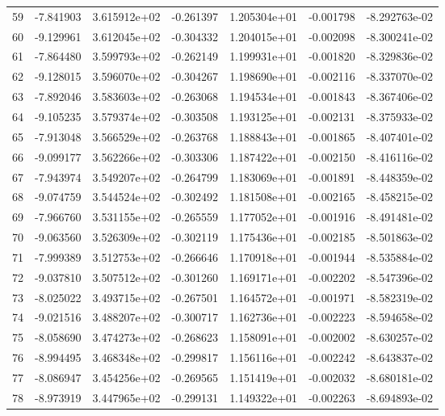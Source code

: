 \begin{tabular}{rrrrrrr}
  59 &  -7.841903 &  3.615912e+02 & -0.261397 &  1.205304e+01 &  -0.001798 & -8.292763e-02 \\
  60 &  -9.129961 &  3.612045e+02 & -0.304332 &  1.204015e+01 &  -0.002098 & -8.300241e-02 \\
  61 &  -7.864480 &  3.599793e+02 & -0.262149 &  1.199931e+01 &  -0.001820 & -8.329836e-02 \\
  62 &  -9.128015 &  3.596070e+02 & -0.304267 &  1.198690e+01 &  -0.002116 & -8.337070e-02 \\
  63 &  -7.892046 &  3.583603e+02 & -0.263068 &  1.194534e+01 &  -0.001843 & -8.367406e-02 \\
  64 &  -9.105235 &  3.579374e+02 & -0.303508 &  1.193125e+01 &  -0.002131 & -8.375933e-02 \\
  65 &  -7.913048 &  3.566529e+02 & -0.263768 &  1.188843e+01 &  -0.001865 & -8.407401e-02 \\
  66 &  -9.099177 &  3.562266e+02 & -0.303306 &  1.187422e+01 &  -0.002150 & -8.416116e-02 \\
  67 &  -7.943974 &  3.549207e+02 & -0.264799 &  1.183069e+01 &  -0.001891 & -8.448359e-02 \\
  68 &  -9.074759 &  3.544524e+02 & -0.302492 &  1.181508e+01 &  -0.002165 & -8.458215e-02 \\
  69 &  -7.966760 &  3.531155e+02 & -0.265559 &  1.177052e+01 &  -0.001916 & -8.491481e-02 \\
  70 &  -9.063560 &  3.526309e+02 & -0.302119 &  1.175436e+01 &  -0.002185 & -8.501863e-02 \\
  71 &  -7.999389 &  3.512753e+02 & -0.266646 &  1.170918e+01 &  -0.001944 & -8.535884e-02 \\
  72 &  -9.037810 &  3.507512e+02 & -0.301260 &  1.169171e+01 &  -0.002202 & -8.547396e-02 \\
  73 &  -8.025022 &  3.493715e+02 & -0.267501 &  1.164572e+01 &  -0.001971 & -8.582319e-02 \\
  74 &  -9.021516 &  3.488207e+02 & -0.300717 &  1.162736e+01 &  -0.002223 & -8.594658e-02 \\
  75 &  -8.058690 &  3.474273e+02 & -0.268623 &  1.158091e+01 &  -0.002002 & -8.630257e-02 \\
  76 &  -8.994495 &  3.468348e+02 & -0.299817 &  1.156116e+01 &  -0.002242 & -8.643837e-02 \\
  77 &  -8.086947 &  3.454256e+02 & -0.269565 &  1.151419e+01 &  -0.002032 & -8.680181e-02 \\
  78 &  -8.973919 &  3.447965e+02 & -0.299131 &  1.149322e+01 &  -0.002263 & -8.694893e-02 \\

\end{tabular}
